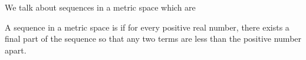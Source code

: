 
\sbasic

















\sstart
{}


We talk about sequences in
a metric space which are


A sequence in a metric space
is  if
for every positive real number,
there exists a final
part of the sequence so that
any two terms are less than the
positive number apart.
\strats
